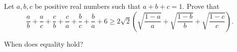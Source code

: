Let $a,b,c$ be positive real numbers such that $a+b+c=1$. Prove that\[\frac {a}{b} + \frac {a}{c} + \frac {c}{b} + \frac {c}{a} + \frac {b}{c} + \frac {b}{a} + 6 \geq 2\sqrt{2}\left (\sqrt{\frac{1-a}{a}} + \sqrt{\frac{1-b}{b}} + \sqrt{\frac{1-c}{c}}\right ).\]

When does equality hold?